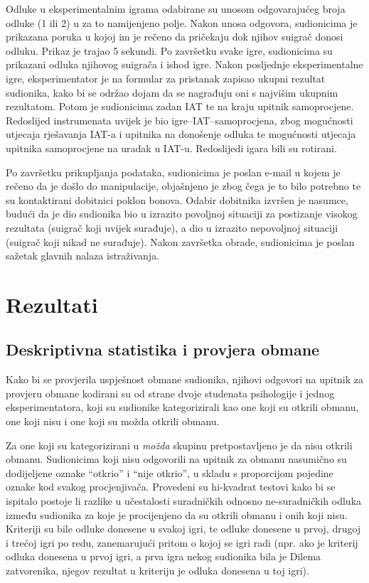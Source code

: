 \documentclass[a4paper, 12pt]{report}
\begin{document}
Odluke u eksperimentalnim igrama odabirane su unosom odgovarajućeg broja odluke
(1 ili 2) u za to namijenjeno polje. Nakon unosa odgovora, sudionicima je
prikazana poruka u kojoj im je rečeno da pričekaju dok njihov suigrač donosi
odluku. Prikaz je trajao 5 sekundi. Po završetku svake igre, sudionicima su
prikazani odluka njihovog suigrača i ishod igre. 
Nakon posljednje eksperimentalne igre, eksperimentator je  na formular za pristanak zapisao
ukupni rezultat sudionika, kako bi se održao dojam da se
nagrađuju oni s najvišim ukupnim rezultatom. Potom je sudionicima zadan IAT
te na kraju upitnik samoprocjene.
Redoslijed instrumenata uvijek je bio igre--IAT--samoprocjena, zbog mogućnosti
utjecaja rješavanja IAT-a i upitnika na donošenje odluka te mogućnosti utjecaja
upitnika samoprocjene na uradak u IAT-u. Redoslijedi
igara bili su rotirani.

Po završetku prikupljanja podataka, sudionicima je poslan e-mail u kojem je
rečeno da je došlo do manipulacije, objašnjeno je zbog čega je to bilo
potrebno  te su kontaktirani dobitnici poklon
bonova. Odabir dobitnika izvršen je nasumce, budući da je dio sudionika bio u izrazito
povoljnoj situaciji za postizanje visokog rezultata (suigrač koji uvijek
surađuje), a dio u izrazito nepovoljnoj situaciji (suigrač koji nikad ne
surađuje). Nakon završetka obrade, sudionicima je poslan sažetak glavnih nalaza
istraživanja.

\section{Rezultati}

\subsection{Deskriptivna statistika i provjera obmane} 

Kako bi se provjerila uspješnost obmane sudionika, njihovi odgovori na upitnik
za provjeru obmane kodirani su od strane dvoje studenata psihologije i jednog
eksperimentatora, koji su
sudionike kategorizirali kao one koji su otkrili obmanu, one koji nisu i one
koji su možda otkrili obmanu.

Za one koji su kategorizirani u \emph{možda} skupinu pretpostavljeno je da nisu
otkrili obmanu. Sudionicima koji nisu odgovorili na upitnik za obmanu
nasumično su dodijeljene oznake \enquote{otkrio} i \enquote{nije otkrio},
u skladu s proporcijom pojedine oznake kod svakog procjenjivača.
Provedeni su hi-kvadrat testovi kako bi se ispitalo postoje li
razlike u učestalosti suradničkih odnosno ne-suradničkih odluka između sudionika
za koje je procijenjeno da su otkrili obmanu i onih koji nisu. 
Kriteriji su bile odluke donesene u svakoj igri, te odluke
donesene u prvoj, drugoj i trećoj igri po redu, zanemarujući pritom o kojoj se
igri radi (npr. ako je kriterij odluka donesena u prvoj igri, a prva igra nekog
sudionika bila je Dilema zatvorenika, njegov rezultat u kriteriju je odluka
donesena u toj igri).
\end{document}
